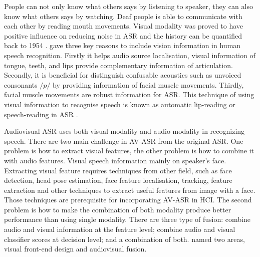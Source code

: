 People can not only know what others says by listening to speaker, they can also know what others says by watching. Deaf people is able to communicate with each other by reading mouth movements. Visual modality was proved to have positive influence on reducing noise in ASR and the history can be quantified back to 1954 \cite{potamianos2003recent}. \cite{potamianos2003recent} gave three key reasons to include vision information in human speech recognition. Firstly it helps audio source localisation, visual information of tongue, teeth, and lips provide complementary information of articulation. Secondly, it is beneficial for distinguish confusable acoustics such as unvoiced consonants $/p/$ by providing information of facial muscle movements. Thirdly, facial muscle movements are robust information for ASR. This technique of using visual information to recognise speech is known as automatic lip-reading or speech-reading in ASR \cite{potamianos2003recent}.

Audiovisual ASR uses both visual modality and audio modality in recognizing speech. There are two main challenge in AV-ASR from the original ASR. One problem is how to extract visual features, the other problem is how to combine it with audio features. Visual speech information mainly on speaker's face. Extracting visual feature requires techniques from other field, such as face detection, head pose estimation, face feature localisation, tracking, feature extraction and other techniques to extract useful features from image with a face. Those techniques are prerequisite for incorporating AV-ASR in HCI. The second problem is how to make the combination of both modality produce better performance than using single modality. There are three type of fusion: combine audio and visual information at the feature level; combine audio and visual classifier scores at decision level; and a combination of both. \cite{potamianos2003recent} named two areas, visual front-end design and audiovisual fusion.

